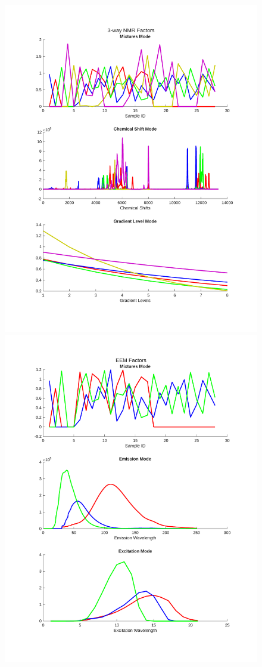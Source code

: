 \begin{figure}[H]
    \centering
    \includegraphics[trim = 2cm 5cm 2cm 5cm, clip, width=0.46\linewidth]{figures/factors_3-way NMR Factors.pdf}
    \includegraphics[trim = 2cm 5cm 2cm 5cm, clip, width=0.46\linewidth]{figures/factors_EEM Factors.pdf}
    \caption{}
    \label{fig:plot_factors}
\end{figure}
